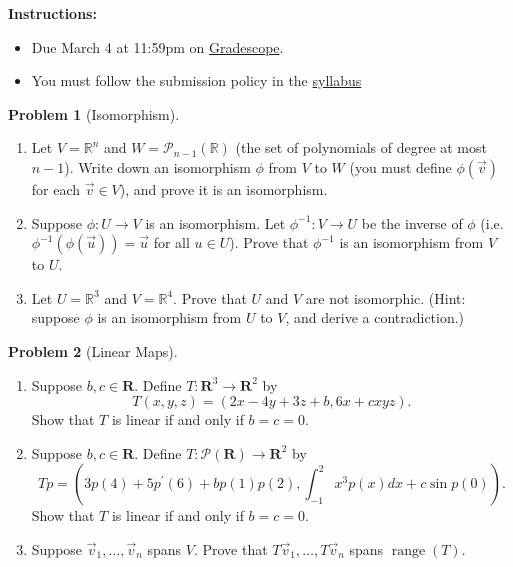 \documentclass[12pt]{article}
\theoremstyle{definition}
\newtheorem{problem}{Problem}
\newcommand{\range}{\operatorname{range}}
\begin{document}
\textbf{\Large{}}
    
\vspace{-1.8em}
\hrulefill

\textbf{Instructions:}
    \begin{itemize}
        \item Due March 4 at 11:59pm on \href{https://www.gradescope.com/courses/709136}{Gradescope}.
        \item You must follow the submission policy in the \href{https://courses.chen.pw/la_s2024/syllabus.html}{syllabus} 
\end{itemize}
   
\vspace{.5em}

\begin{problem}[Isomorphism]~
    \begin{enumerate}
        \item Let $V = \mathbb{R}^n$ and $W = \mathcal{P}_{n-1}(\mathbb{R})$ (the set of polynomials of degree at most $n-1$). Write down an isomorphism $\phi$ from $V$ to $W$ (you must define $\phi(\vec{v})$ for each $\vec{v}\in V$), and prove it is an isomorphism.
        \item Suppose $\phi:U\to V$ is an isomorphism. Let $\phi^{-1}:V\to U$ be the inverse of $\phi$ (i.e. $\phi^{-1}(\phi(\vec{u})) = \vec{u}$ for all $u\in U$). Prove that $\phi^{-1}$ is an isomorphism from $V$ to $U$.
        \item Let $U = \mathbb{R}^3$ and $V = \mathbb{R}^4$. Prove that $U$ and $V$ are not isomorphic. (Hint: suppose $\phi$ is an isomorphism from $U$ to $V$, and derive a contradiction.)
    \end{enumerate}
    \end{problem}


\begin{problem}[Linear Maps]~
\begin{enumerate}
    \item Suppose $b, c \in \mathbf{R}$. Define $T: \mathbf{R}^3 \rightarrow \mathbf{R}^2$ by
    \[
    T(x, y, z)=(2 x-4 y+3 z+b, 6 x+c x y z) .
    \]
    Show that $T$ is linear if and only if $b=c=0$.

    \item Suppose $b, c \in \mathbf{R}$. Define $T: \mathcal{P}(\mathbf{R}) \rightarrow \mathbf{R}^2$ by
    \[
    T p=\left(3 p(4)+5 p^{\prime}(6)+b p(1) p(2), \int_{-1}^2 x^3 p(x) d x+c \sin p(0)\right) .
    \]
    Show that $T$ is linear if and only if $b=c=0$.
    \item Suppose $\vec{v}_1, \ldots, \vec{v}_n$ spans $V$. Prove that $T \vec{v}_1, \ldots, T \vec{v}_n$ spans $\range(T)$.
\end{enumerate}
\end{problem}
\end{document}

